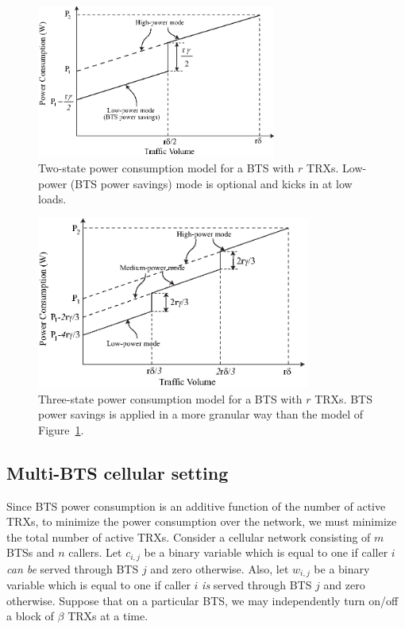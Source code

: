 \begin{figure}
\centering
\includegraphics[width=0.7\textwidth]{pics/ilyas4a.eps}

\caption{Two-state power consumption model for a BTS with $r$ TRXs. Low-power (BTS power savings) mode is optional and kicks in at low loads.}
\label{fig:powermodel1}
\end{figure}
\begin{figure}
\centering
\includegraphics[width=0.8\textwidth]{pics/ilyas4b.eps}
\caption{Three-state power consumption model for a BTS with $r$ TRXs. BTS power savings is applied in a more granular way than the model of Figure~\ref{fig:powermodel1}.}
\label{fig:powermodel2}
\end{figure}

\subsection{Multi-BTS cellular setting}
Since BTS power consumption is an additive function of the number of active TRXs, to minimize the power consumption over the network, we must minimize the total number of active TRXs.  Consider a cellular network consisting of $m$ BTSs and $n$ callers. 
Let $c_{i,j}$ be a binary variable which is equal to one if caller $i$ \textit{can be} served through BTS $j$ and zero otherwise.
Also, let $w_{i,j}$ be a binary variable which is equal to one if caller $i$ \textit{is} served through BTS $j$ and zero otherwise. Suppose that on a particular BTS, we may independently turn on/off a block of $\beta$ TRXs at a time.

